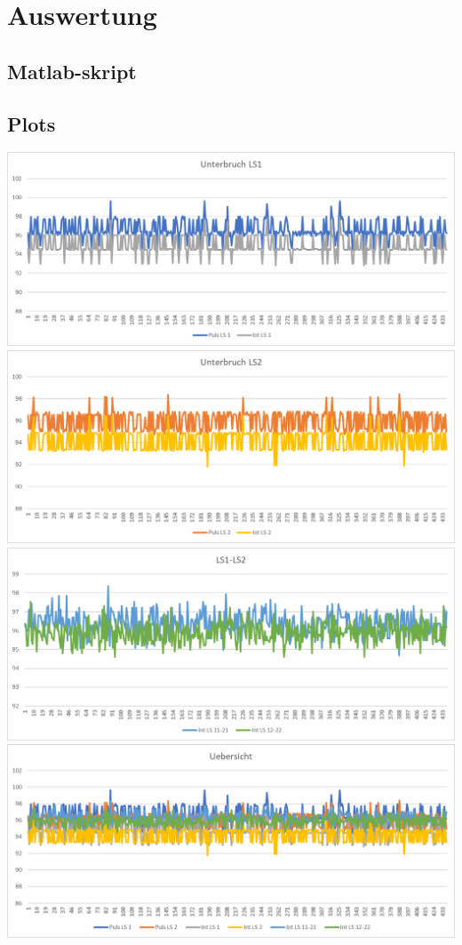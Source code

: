 \section{Auswertung}\label{app:Auswertung}
\subsection{Matlab-skript}\label{app:matlab}

\clearpage
\subsection{Plots}
\includegraphics[width=\textwidth]{images/auswertungLS1.png}\\
\includegraphics[width=\textwidth]{images/auswertungLS2.png}\\
\includegraphics[width=\textwidth]{images/auswertungLS1LS2.png}\\
\includegraphics[width=\textwidth]{images/auswertungInt.png}\\\


